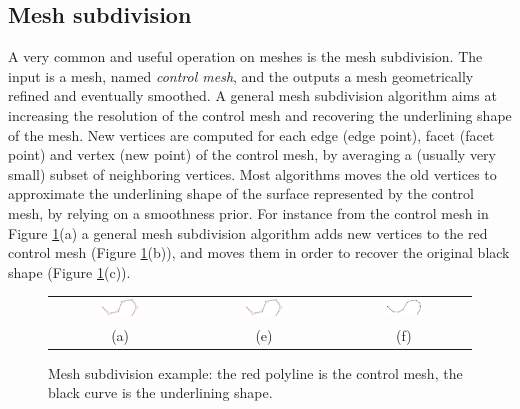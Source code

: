 \subsection{Mesh subdivision}
A very common and useful operation on meshes is the mesh subdivision.
The input is a mesh, named \emph{control mesh}, and the outputs a mesh geometrically refined and eventually smoothed.
A general mesh subdivision algorithm aims at increasing the resolution of the control mesh and recovering the underlining shape of the mesh.
New vertices are computed for each edge (edge point), facet (facet point) and vertex (new point) of the control mesh, by averaging a (usually very small) subset of neighboring vertices. 
Most algorithms moves the old vertices to approximate the underlining shape of the surface represented by the control mesh, by relying on a smoothness prior.
For instance from the control mesh in Figure \ref{fig:subdivision}(a) a general mesh subdivision algorithm adds new vertices to the red control mesh (Figure \ref{fig:subdivision}(b)), and moves them in order to recover the original black shape (Figure \ref{fig:subdivision}(c)).


\begin{figure}[tp]
\begin{center}
 \begin{tabular}{ccc}
  \includegraphics[width=0.28\textwidth]{./img/subdivision1d}&
  \includegraphics[width=0.28\textwidth]{./img/subdivision1d02}&
  \includegraphics[width=0.28\textwidth]{./img/subdivision1d03}\\
  (a)&(e)&(f)\\
 \end{tabular}
 \caption{Mesh subdivision example: the red polyline is the control mesh, the black curve is the underlining shape.}
 \label{fig:subdivision}
\end{center}
\end{figure}


